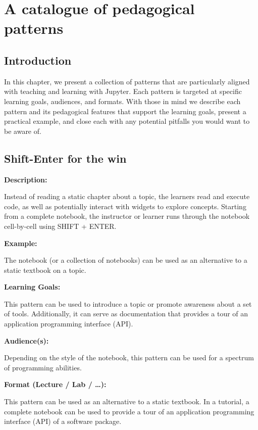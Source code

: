 \documentclass[]{book}
\begin{document}
\chapter{A catalogue of pedagogical patterns}\label{catalogue}

\section{Introduction}\label{introduction-1}

In this chapter, we present a collection of patterns that are
particularly aligned with teaching and learning with Jupyter. Each
pattern is targeted at specific learning goals, audiences, and formats.
With those in mind we describe each pattern and its pedagogical features
that support the learning goals, present a practical example, and close
each with any potential pitfalls you would want to be aware of.

\section{Shift-Enter for the win}\label{shift-enter-for-the-win}

\textbf{Description:}

Instead of reading a static chapter about a topic, the learners read and
execute code, as well as potentially interact with widgets to explore
concepts. Starting from a complete notebook, the instructor or learner
runs through the notebook cell-by-cell using SHIFT + ENTER.

\textbf{Example:}

The notebook (or a collection of notebooks) can be used as an
alternative to a static textbook on a topic.

\textbf{Learning Goals:}

This pattern can be used to introduce a topic or promote awareness about
a set of tools. Additionally, it can serve as documentation that
provides a tour of an application programming interface (API).

\textbf{Audience(s):}

Depending on the style of the notebook, this pattern can be used for a
spectrum of programming abilities.

\textbf{Format (Lecture / Lab / \ldots{}):}

This pattern can be used as an alternative to a static textbook. In a
tutorial, a complete notebook can be used to provide a tour of an
application programming interface (API) of a software package.
\end{document}
